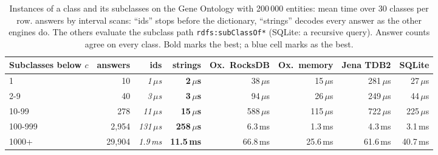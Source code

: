 \begin{table}[t]
\caption{Instances of a class and its subclasses on the Gene Ontology with 200\,000 entities: mean time over 30 classes per row. \sys{} answers by interval scans: ``ids'' stops before the dictionary, ``strings'' decodes every answer as the other engines do. The others evaluate the subclass path \texttt{rdfs:subClassOf*} (SQLite: a recursive query). Answer counts agree on every class. Bold marks the best; a blue cell marks \sys{} as the best.}
\label{tab-hier}
\small
\begin{tabular}{@{}lrrrrrrr@{}}
\toprule
Subclasses below $c$ & answers & \sys{} ids & \sys{} strings & Ox.\ RocksDB & Ox.\ memory & Jena TDB2 & SQLite \\
\midrule
1 & 10 & \emph{1\,$\mu$s} & \cellcolor{ours}\textbf{2\,$\mu$s} & 38\,$\mu$s & 15\,$\mu$s & 281\,$\mu$s & 27\,$\mu$s \\
2-9 & 40 & \emph{3\,$\mu$s} & \cellcolor{ours}\textbf{3\,$\mu$s} & 94\,$\mu$s & 26\,$\mu$s & 249\,$\mu$s & 44\,$\mu$s \\
10-99 & 278 & \emph{11\,$\mu$s} & \cellcolor{ours}\textbf{15\,$\mu$s} & 588\,$\mu$s & 115\,$\mu$s & 722\,$\mu$s & 225\,$\mu$s \\
100-999 & 2,954 & \emph{131\,$\mu$s} & \cellcolor{ours}\textbf{258\,$\mu$s} & 6.3\,ms & 1.3\,ms & 4.3\,ms & 3.1\,ms \\
1000+ & 29,904 & \emph{1.9\,ms} & \cellcolor{ours}\textbf{11.5\,ms} & 66.8\,ms & 25.6\,ms & 61.6\,ms & 40.7\,ms \\
\bottomrule
\end{tabular}
\end{table}
